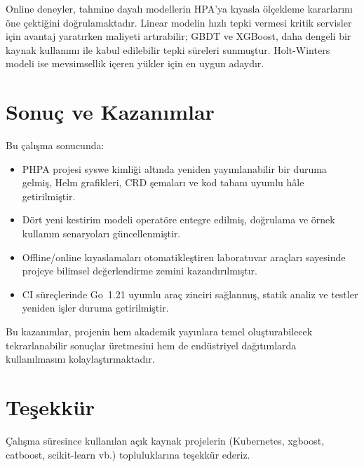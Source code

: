 \documentclass[12pt,a4paper]{article}
\begin{document}
Online deneyler, tahmine dayalı modellerin HPA’ya kıyasla ölçekleme kararlarını öne çektiğini doğrulamaktadır. Linear modelin hızlı tepki vermesi kritik servisler için avantaj yaratırken maliyeti artırabilir; GBDT ve XGBoost, daha dengeli bir kaynak kullanımı ile kabul edilebilir tepki süreleri sunmuştur. Holt-Winters modeli ise mevsimsellik içeren yükler için en uygun adaydır.

\section{Sonuç ve Kazanımlar}
Bu çalışma sonucunda:
\begin{itemize}[noitemsep]
  \item PHPA projesi syswe kimliği altında yeniden yayımlanabilir bir duruma gelmiş, Helm grafikleri, CRD şemaları ve kod tabanı uyumlu hâle getirilmiştir.
  \item Dört yeni kestirim modeli operatöre entegre edilmiş, doğrulama ve örnek kullanım senaryoları güncellenmiştir.
  \item Offline/online kıyaslamaları otomatikleştiren laboratuvar araçları sayesinde projeye bilimsel değerlendirme zemini kazandırılmıştır.
  \item CI süreçlerinde Go~1.21 uyumlu araç zinciri sağlanmış, statik analiz ve testler yeniden işler duruma getirilmiştir.
\end{itemize}

Bu kazanımlar, projenin hem akademik yayınlara temel oluşturabilecek tekrarlanabilir sonuçlar üretmesini hem de endüstriyel dağıtımlarda kullanılmasını kolaylaştırmaktadır.

\section*{Teşekkür}
Çalışma süresince kullanılan açık kaynak projelerin (Kubernetes, xgboost, catboost, scikit-learn vb.) topluluklarına teşekkür ederiz.
\end{document}
